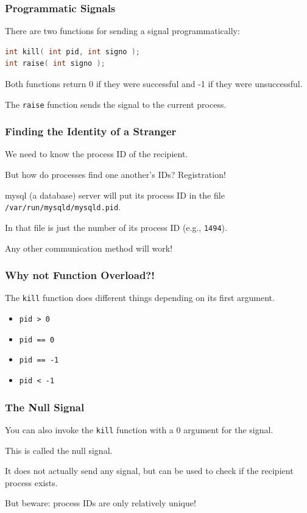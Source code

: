 \begin{frame}[fragile]
\frametitle{Programmatic Signals}

There are two functions for sending a signal programmatically:

\begin{lstlisting}[language=C]
int kill( int pid, int signo );
int raise( int signo );
\end{lstlisting}

Both functions return 0 if they were successful and -1 if they were unsuccessful.

The \texttt{raise} function sends the signal to the current process.

\end{frame}


\begin{frame}
\frametitle{Finding the Identity of a Stranger}

We need to know the process ID of the recipient.

But how do processes find one another's IDs? Registration!

mysql (a database) server will put its process ID in the file \texttt{/var/run/mysqld/mysqld.pid}. 

In that file is just the number of its process ID (e.g., \texttt{1494}).

Any other communication method will work!

\end{frame}


\begin{frame}
\frametitle{Why not Function Overload?!}

The \texttt{kill} function does different things depending on its first argument.

\begin{itemize}
	\item \texttt{pid > 0}
	\item \texttt{pid == 0}
	\item \texttt{pid == -1}
	\item \texttt{pid < -1}
\end{itemize}

\end{frame}

\begin{frame}
\frametitle{The Null Signal}

You can also invoke the \texttt{kill} function with a 0 argument for the signal.

This is called the \alert{null signal}. 

It does not actually send any signal, but can be used to check if the recipient process exists.

But beware: process IDs are only relatively unique!

\end{frame}



